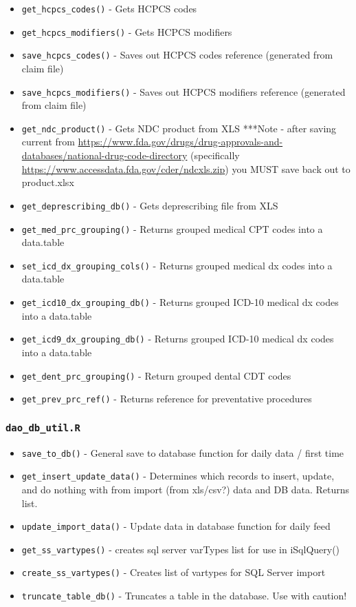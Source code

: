 \documentclass[
]{book}
\providecommand{\tightlist}{%
  \setlength{\itemsep}{0pt}\setlength{\parskip}{0pt}}
\begin{document}
\begin{itemize}
\tightlist
\item
  \texttt{get\_hcpcs\_codes()} - Gets HCPCS codes
\item
  \texttt{get\_hcpcs\_modifiers()} - Gets HCPCS modifiers
\item
  \texttt{save\_hcpcs\_codes()} - Saves out HCPCS codes reference (generated from claim file)
\item
  \texttt{save\_hcpcs\_modifiers()} - Saves out HCPCS modifiers reference (generated from claim file)
\item
  \texttt{get\_ndc\_product()} - Gets NDC product from XLS ***Note - after saving current from \url{https://www.fda.gov/drugs/drug-approvals-and-databases/national-drug-code-directory} (specifically \url{https://www.accessdata.fda.gov/cder/ndcxls.zip}) you MUST save back out to product.xlsx
\item
  \texttt{get\_deprescribing\_db()} - Gets deprescribing file from XLS
\item
  \texttt{get\_med\_prc\_grouping()} - Returns grouped medical CPT codes into a data.table
\item
  \texttt{set\_icd\_dx\_grouping\_cols()} - Returns grouped medical dx codes into a data.table
\item
  \texttt{get\_icd10\_dx\_grouping\_db()} - Returns grouped ICD-10 medical dx codes into a data.table
\item
  \texttt{get\_icd9\_dx\_grouping\_db()} - Returns grouped ICD-10 medical dx codes into a data.table
\item
  \texttt{get\_dent\_prc\_grouping()} - Return grouped dental CDT codes
\item
  \texttt{get\_prev\_prc\_ref()} - Returns reference for preventative procedures
\end{itemize}

\hypertarget{dao_db_util.r}{%
\subsubsection{\texorpdfstring{\texttt{dao\_db\_util.R}}{dao\_db\_util.R}}\label{dao_db_util.r}}

\begin{itemize}
\tightlist
\item
  \texttt{save\_to\_db()} - General save to database function for daily data / first time
\item
  \texttt{get\_insert\_update\_data()} - Determines which records to insert, update, and do nothing with from import (from xls/csv?) data and DB data. Returns list.
\item
  \texttt{update\_import\_data()} - Update data in database function for daily feed
\item
  \texttt{get\_ss\_vartypes()} - creates sql server varTypes list for use in iSqlQuery()
\item
  \texttt{create\_ss\_vartypes()} - Creates list of vartypes for SQL Server import
\item
  \texttt{truncate\_table\_db()} - Truncates a table in the database. Use with caution!
\end{itemize}
\end{document}
